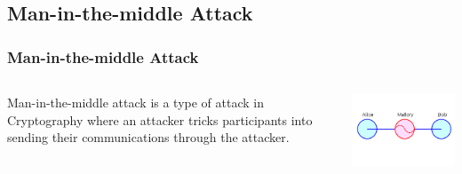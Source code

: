 \documentclass{beamer}
\begin{document}
\subsection{Man-in-the-middle Attack}
\begin{frame}
		\frametitle{Man-in-the-middle Attack}
		\begin{columns}
		\begin{column}[T]{5cm}
		Man-in-the-middle attack is a type of attack in Cryptography where an attacker tricks participants into sending their communications through the attacker.   
		\end{column}
		\includegraphics[scale=.45]{Images/MIM.jpg}
		\end{columns}
		\end{frame}
		
\end{document}
